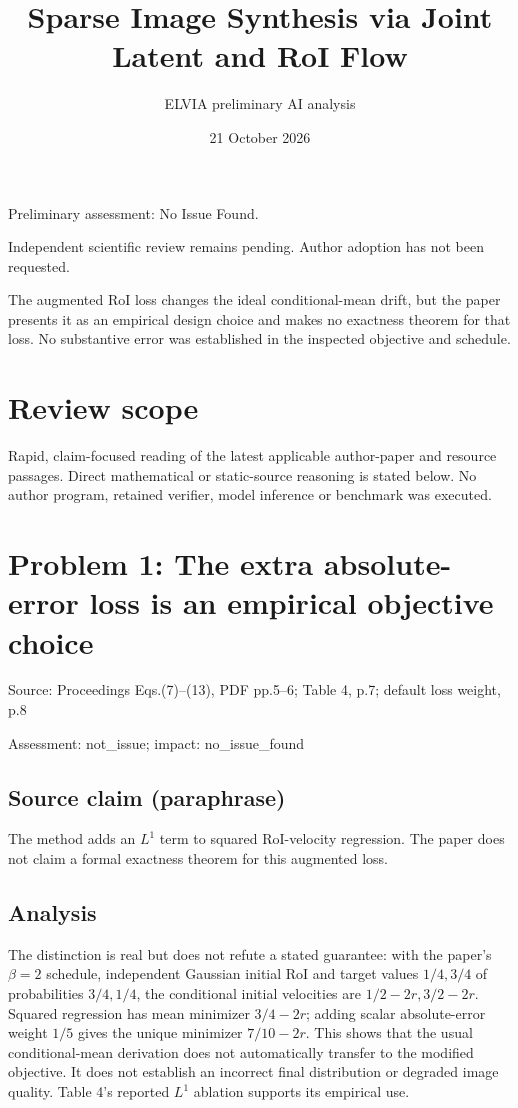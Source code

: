 \documentclass[11pt]{article}
\begin{document}
\title{Sparse Image Synthesis via Joint Latent and RoI Flow}

\author{ELVIA preliminary AI analysis}\date{21 October 2026}\maketitle

Preliminary assessment: No Issue Found.\par

Independent scientific review remains pending. Author adoption has not been requested.

The augmented RoI loss changes the ideal conditional-mean drift, but the paper presents it as an empirical design choice and makes no exactness theorem for that loss. No substantive error was established in the inspected objective and schedule.

\section*{Review scope}

Rapid, claim-focused reading of the latest applicable author-paper and resource passages. Direct mathematical or static-source reasoning is stated below. No author program, retained verifier, model inference or benchmark was executed.

\section*{Problem 1: The extra absolute-error loss is an empirical objective choice}

Source: Proceedings Eqs.(7)–(13), PDF pp.5–6; Table 4, p.7; default loss weight, p.8

Assessment: not\_issue; impact: no\_issue\_found

\subsection*{Source claim (paraphrase)}

The method adds an \(L^1\) term to squared RoI-velocity regression. The paper does not claim a formal exactness theorem for this augmented loss.

\subsection*{Analysis}

The distinction is real but does not refute a stated guarantee: with the paper’s \(\beta=2\) schedule, independent Gaussian initial RoI and target values \(1/4,3/4\) of probabilities \(3/4,1/4\), the conditional initial velocities are \(1/2-2r,3/2-2r\). Squared regression has mean minimizer \(3/4-2r\); adding scalar absolute-error weight \(1/5\) gives the unique minimizer \(7/10-2r\). This shows that the usual conditional-mean derivation does not automatically transfer to the modified objective. It does not establish an incorrect final distribution or degraded image quality. Table 4’s reported \(L^1\) ablation supports its empirical use.
\end{document}
